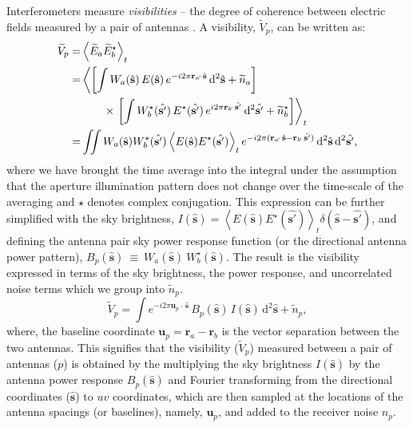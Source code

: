 \documentclass[a4paper,fleqn,usenatbib]{mnras}
\newcommand{\dif}{\mathrm{d}}
\begin{document}
Interferometers measure {\it visibilities} -- the degree of coherence between
electric fields measured by a pair of antennas \citep{van34,zer38,tho01}.
A visibility, $\widetilde{V}_p$, can be written as:
\begin{align}
  \widetilde{V}_p = &\left\langle \widetilde{E}_a\widetilde{E}_b^\star \right\rangle_t \label{eqn:cc-vis}\hfill\\
  		= &\left\langle \left[ \int {W}_a(\hat{\mathbf{s}})\,E(\hat{\mathbf{s}})\,e^{-i2\pi\mathbf{r}_a\!\cdot\,\hat{\mathbf{s}}}\,\dif^2\hat{\mathbf{s}} + \widetilde{n}_a \right] \right. \nonumber\\
		&\qquad \times \left.\left[ \int {W}^\star_b(\hat{\mathbf{s'}})\,E^\star (\hat{\mathbf{s'}})\,e^{i2\pi\mathbf{r}_b\!\cdot\,\hat{\mathbf{s'}}}\,\dif^2\hat{\mathbf{s'}} + \widetilde{n}^\star_b \right] \right\rangle_t \\
                  =& \iint {W}_a(\hat{\mathbf{s}}) {W}^\star_b(\hat{\mathbf{s'}}) \left\langle E(\hat{\mathbf{s}}) E^\star(\hat{\mathbf{s'}}) \right\rangle_t e^{-i2\pi(\mathbf{r}_a\!\cdot\,\hat{\mathbf{s}}-\mathbf{r}_b\!\cdot\,\hat{\mathbf{s'}})}\,\dif^2\hat{\mathbf{s}}\,\dif^2\hat{\mathbf{s'}},
\end{align}
where we have brought the time average into the integral under the assumption that 
the aperture illumination pattern does not change over the time-scale of the 
averaging and $\star$ denotes complex conjugation. This expression can be further 
simplified with the sky brightness, 
$I(\hat{\mathbf{s}})= \left\langle E(\hat{\mathbf{s}}) E^\star(\hat{\mathbf{s'}}) 
\right\rangle_t  \delta(\hat{\mathbf{s}}-\hat{\mathbf{s'}})$, and defining the 
antenna pair sky power response function (or the directional antenna power pattern), 
$B_p(\hat{\mathbf{s}})~\equiv~{W}_a(\hat{\mathbf{s}})~{W}^\star_b(\hat{\mathbf{s}})$. 
The result is the visibility expressed in terms of the sky brightness, the power 
response, and uncorrelated noise terms which we group into $\widetilde{n}_p$.
\begin{equation}
\widetilde{V}_p = \int e^{-i2\pi\mathbf{u}_p\!\cdot\,\hat{\mathbf{s}}}\,B_p(\hat{\mathbf{s}})\,I(\hat{\mathbf{s}})\,\dif^2\hat{\mathbf{s}} + \widetilde{n}_p,
\end{equation}
where, the baseline coordinate $\mathbf{u}_p=\mathbf{r}_a-\mathbf{r}_b$ is the 
vector separation between the two antennas. This signifies that the visibility 
($\widetilde{V}_p$) measured between a
pair of antennas ($p$) is obtained by the multiplying the sky brightness
$I(\hat{\mathbf{s}})$ by the antenna power response $B_p(\hat{\mathbf{s}})$ and
Fourier transforming from the directional coordinates ($\hat{\mathbf{s}}$) to $uv$
coordinates, which are then sampled at the locations of the antenna spacings (or
baselines), namely, $\mathbf{u}_p$, and added to the receiver noise $n_p$. 
\end{document}
